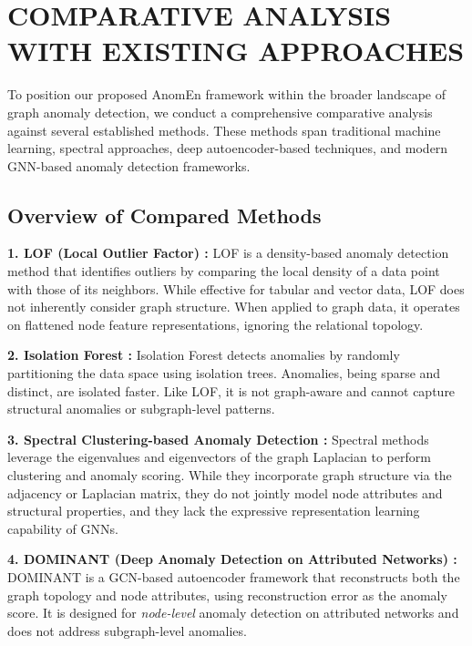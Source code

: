 
\section{COMPARATIVE ANALYSIS WITH EXISTING APPROACHES}

To position our proposed AnomEn framework within the broader landscape of graph anomaly detection, we conduct a comprehensive comparative analysis against several established methods. These methods span traditional machine learning, spectral approaches, deep autoencoder-based techniques, and modern GNN-based anomaly detection frameworks.

\subsection{Overview of Compared Methods}

\textbf{1. LOF (Local Outlier Factor) \cite{breunig2000lof}:}
LOF is a density-based anomaly detection method that identifies outliers by comparing the local density of a data point with those of its neighbors. While effective for tabular and vector data, LOF does not inherently consider graph structure. When applied to graph data, it operates on flattened node feature representations, ignoring the relational topology.

\textbf{2. Isolation Forest \cite{liu2008isolation}:}
Isolation Forest detects anomalies by randomly partitioning the data space using isolation trees. Anomalies, being sparse and distinct, are isolated faster. Like LOF, it is not graph-aware and cannot capture structural anomalies or subgraph-level patterns.

\textbf{3. Spectral Clustering-based Anomaly Detection \cite{ng2001spectral}:}
Spectral methods leverage the eigenvalues and eigenvectors of the graph Laplacian to perform clustering and anomaly scoring. While they incorporate graph structure via the adjacency or Laplacian matrix, they do not jointly model node attributes and structural properties, and they lack the expressive representation learning capability of GNNs.

\textbf{4. DOMINANT (Deep Anomaly Detection on Attributed Networks) \cite{ding2019dominant}:}
DOMINANT is a GCN-based autoencoder framework that reconstructs both the graph topology and node attributes, using reconstruction error as the anomaly score. It is designed for \textit{node-level} anomaly detection on attributed networks and does not address subgraph-level anomalies.

